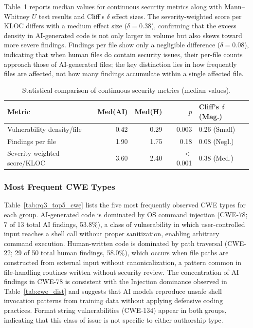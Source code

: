 Table~\ref{tab:cont_metrics} reports median values for continuous security metrics along with Mann--Whitney $U$ test results and Cliff's $\delta$ effect sizes. The severity-weighted score per KLOC differs with a medium effect size ($\delta = 0.38$), confirming that the excess density in AI-generated code is not only larger in volume but also skews toward more severe findings. Findings per file show only a negligible difference ($\delta = 0.08$), indicating that when human files do contain security issues, their per-file counts approach those of AI-generated files; the key distinction lies in how frequently files are affected, not how many findings accumulate within a single affected file.

\begin{table}[H]
\caption{Statistical comparison of continuous security metrics (median values).}
\label{tab:cont_metrics}
\centering
\small
\begin{tabularx}{\columnwidth}{@{}p{} r r r p{}@{}}
\toprule
\textbf{Metric} & \textbf{Med(AI)} & \textbf{Med(H)} & \textbf{$p$} & \textbf{Cliff's $\delta$ (Mag.)} \\
\midrule
Vulnerability density/file   & 0.42 & 0.29 & 0.003    & 0.26 (Small) \\
Findings per file            & 1.90 & 1.75 & 0.18     & 0.08 (Negl.) \\
Severity-weighted score/KLOC & 3.60 & 2.40 & $<$0.001 & 0.38 (Med.)  \\
\bottomrule
\end{tabularx}
\end{table}

\subsubsection{Most Frequent CWE Types}

Table~\ref{tab:rq3_top5_cwe} lists the five most frequently observed CWE types for each group. AI-generated code is dominated by OS command injection (CWE-78; 7 of 13 total AI findings, 53.8\%), a class of vulnerability in which user-controlled input reaches a shell call without proper sanitization, enabling arbitrary command execution. Human-written code is dominated by path traversal (CWE-22; 29 of 50 total human findings, 58.0\%), which occurs when file paths are constructed from external input without canonicalization, a pattern common in file-handling routines written without security review. The concentration of AI findings in CWE-78 is consistent with the Injection dominance observed in Table~\ref{tab:cwe_dist} and suggests that AI models reproduce unsafe shell invocation patterns from training data without applying defensive coding practices. Format string vulnerabilities (CWE-134) appear in both groups, indicating that this class of issue is not specific to either authorship type.


